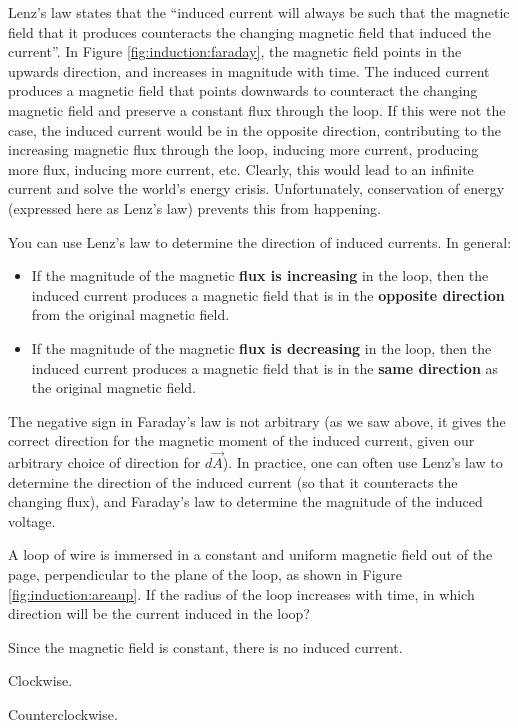 Lenz's law states that the ``induced current will always be such that the magnetic field that it produces counteracts the changing magnetic field that induced the current''. In Figure \ref{fig:induction:faraday}, the magnetic field points in the upwards direction, and increases in magnitude with time. The induced current produces a magnetic field that points downwards to counteract the changing magnetic field and preserve a constant flux through the loop. If this were not the case, the induced current would be in the opposite direction, contributing to the increasing magnetic flux through the loop, inducing more current, producing more flux, inducing more current, etc. Clearly, this would lead to an infinite current and solve the world's energy crisis. Unfortunately, conservation of energy (expressed here as Lenz's law) prevents this from happening. 

You can use Lenz's law to determine the direction of induced currents. In general:
\begin{itemize}
\item If the magnitude of the magnetic \textbf{flux is increasing} in the loop, then the induced current produces a magnetic field that is in the \textbf{opposite direction} from the original magnetic field.
\item If the magnitude of the magnetic \textbf{flux is decreasing} in the loop, then the induced current produces a magnetic field that is in the \textbf{same direction} as the original magnetic field.
\end{itemize}

The negative sign in Faraday's law is not arbitrary (as we saw above, it gives the correct direction for the magnetic moment of the induced current, given our arbitrary choice of direction for $d\vec A$). In practice, one can often use Lenz's law to determine the direction of the induced current (so that it counteracts the changing flux), and Faraday's law to determine the magnitude of the induced voltage.

\begin{checkpoint}{}
	\begin{MCquestion}{A loop of wire is immersed in a constant and uniform magnetic field out of the page, perpendicular to the plane of the loop, as shown in Figure \ref{fig:induction:areaup}. If the radius of the loop increases with time, in which direction will be the current induced in the loop?
	}
		\item Since the magnetic field is constant, there is no induced current.
		\item Clockwise. \correct
		\item Counterclockwise. 
	\end{MCquestion}
\end{checkpoint}

